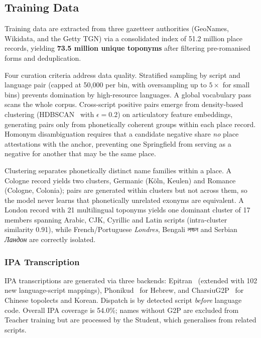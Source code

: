 \documentclass[11pt,a4paper]{article}
\newcommand{\textbn}[1]{{\bengalifont #1}}
\begin{document}
\subsection{Training Data}
\label{subsec:data}

Training data are extracted from three gazetteer authorities (GeoNames, Wikidata, and the Getty TGN) via a consolidated index of 51.2 million place records, yielding \textbf{73.5 million unique toponyms} after filtering pre-romanised forms and deduplication.

Four curation criteria address data quality. Stratified sampling by script and language pair (capped at 50,000 per bin, with oversampling up to $5\times$ for small bins) prevents domination by high-resource languages. A global vocabulary pass scans the whole corpus. Cross-script positive pairs emerge from density-based clustering (HDBSCAN~\citep{mcinnes2017hdbscan} with $\epsilon = 0.2$) on articulatory feature embeddings, generating pairs only from phonetically coherent groups within each place record. Homonym disambiguation requires that a candidate negative share \emph{no} place attestations with the anchor, preventing one Springfield from serving as a negative for another that may be the same place.

Clustering separates phonetically distinct name families within a place. A Cologne record yields two clusters, Germanic (Köln, Keulen) and Romance (Cologne, Colonia); pairs are generated within clusters but not across them, so the model never learns that phonetically unrelated exonyms are equivalent. A London record with 21 multilingual toponyms yields one dominant cluster of 17 members spanning Arabic, CJK, Cyrillic and Latin scripts (intra-cluster similarity 0.91), while French/Portuguese \emph{Londres}, Bengali \textbn{লন্ডন} and Serbian \emph{Ландон} are correctly isolated.

\subsubsection{IPA Transcription}
\label{subsec:g2p}

IPA transcriptions are generated via three backends: Epitran~\citep{mortensen2018} (extended with 102 new language-script mappings), Phonikud~\citep{kolani2025phonikudhebrewgraphemetophonemeconversion} for Hebrew, and CharsiuG2P~\citep{zhu2022charsiu-g2p} for Chinese topolects and Korean. Dispatch is by detected script \emph{before} language code. Overall IPA coverage is 54.0\%; names without G2P are excluded from Teacher training but are processed by the Student, which generalises from related scripts.
\end{document}
